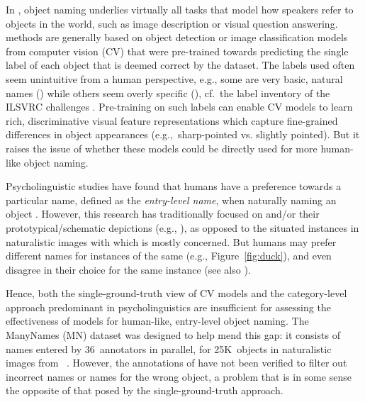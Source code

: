 In \lv, object naming underlies virtually all tasks that model how speakers refer to objects in the world, such as image description or visual question answering.
\lv methods are generally based on object detection or image classification models from computer vision (CV) that were pre-trained towards predicting the single label of each object that is deemed correct by the dataset.
The labels used often seem unintuitive from a human perspective, e.g., some are very basic, natural names () while others seem overly specific (), cf.\ the label inventory of the ILSVRC challenges \cite{ILSVRC15}.
Pre-training on such labels can enable CV models to learn rich, discriminative visual feature representations which capture fine-grained differences in object appearances (e.g.,\ sharp-pointed vs. slightly pointed). 
But it raises the issue of whether these models could be directly used for more human-like object naming.

Psycholinguistic studies have found that humans have a preference towards a particular name, defined as the \textit{entry-level name}, when naturally naming an object \cite{rosch1976basic,Rosch1978,jolicoeur1984pictures}. 
However, this research has traditionally focused on \categories and/or their prototypical/schematic depictions (e.g., ), as opposed to the situated instances in naturalistic images with which \lv is mostly concerned.
But humans may prefer different names for instances of the same \category (e.g., Figure~\ref{fig:duck}), and even disagree in their choice for the same instance (see also \citealt{graf2016animal}).

Hence, both the single-ground-truth view of CV models and the category-level approach predominant in psycholinguistics are insufficient for assessing the effectiveness of \lv models for human-like, entry-level object naming.
The ManyNames (MN) dataset was designed to help mend this gap: it consists of names entered by 36~annotators in parallel, for 25K~objects in naturalistic images from \vg~\cite{krishna2016visualgenome}.
However, the annotations of \mn have not been verified to filter out incorrect names or names for the wrong object, a problem that is in some sense the opposite of that posed by the single-ground-truth approach.

